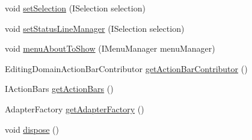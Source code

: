 \begin{DoxyCompactItemize}
\item 
void \hyperlink{classshootingmachineemfmodel_1_1presentation_1_1_shootingmachineemfmodel_editor_ae77c7f7ad258a87cc4a7c02947cd98a7}{set\-Selection} (I\-Selection selection)
\item 
void \hyperlink{classshootingmachineemfmodel_1_1presentation_1_1_shootingmachineemfmodel_editor_afd67eb6512cd0f9358b11d26af1ac7c5}{set\-Status\-Line\-Manager} (I\-Selection selection)
\item 
void \hyperlink{classshootingmachineemfmodel_1_1presentation_1_1_shootingmachineemfmodel_editor_a3a6c89e75e238e91689a46f416fd2a9c}{menu\-About\-To\-Show} (I\-Menu\-Manager menu\-Manager)
\item 
Editing\-Domain\-Action\-Bar\-Contributor \hyperlink{classshootingmachineemfmodel_1_1presentation_1_1_shootingmachineemfmodel_editor_ae5e6c093d44c9a5c182b322a5017c4a6}{get\-Action\-Bar\-Contributor} ()
\item 
I\-Action\-Bars \hyperlink{classshootingmachineemfmodel_1_1presentation_1_1_shootingmachineemfmodel_editor_a56db7bac5a943f7204381ae5f7d7e722}{get\-Action\-Bars} ()
\item 
Adapter\-Factory \hyperlink{classshootingmachineemfmodel_1_1presentation_1_1_shootingmachineemfmodel_editor_ad0c805f3196029daf218bacdf96145ba}{get\-Adapter\-Factory} ()
\item 
void \hyperlink{classshootingmachineemfmodel_1_1presentation_1_1_shootingmachineemfmodel_editor_abcd2d5218fb02ab86adf3279aedc8248}{dispose} ()
\end{DoxyCompactItemize}
